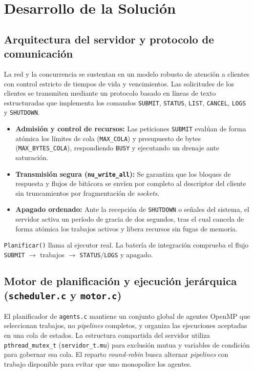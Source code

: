 \documentclass[12pt,a4paper]{article}
\newcommand{\code}[1]{\texttt{#1}}
\begin{document}
\section{Desarrollo de la Solución}

\subsection{Arquitectura del servidor y protocolo de comunicación}

La red y la concurrencia se sustentan en un modelo robusto de atención a clientes con control estricto de tiempos de vida y vencimientos. Las solicitudes de los clientes se transmiten mediante un protocolo basado en líneas de texto estructuradas que implementa los comandos \code{SUBMIT}, \code{STATUS}, \code{LIST}, \code{CANCEL}, \code{LOGS} y \code{SHUTDOWN}.

\begin{itemize}
  \item \textbf{Admisión y control de recursos:} Las peticiones \code{SUBMIT} evalúan de forma atómica los límites de cola (\code{MAX\_COLA}) y presupuesto de bytes (\code{MAX\_BYTES\_COLA}), respondiendo \code{BUSY} y ejecutando un drenaje ante saturación.
  \item \textbf{Transmisión segura (\code{nu\_write\_all}):} Se garantiza que los bloques de respuesta y flujos de bitácora se envíen por completo al descriptor del cliente sin truncamientos por fragmentación de \textit{sockets}.
  \item \textbf{Apagado ordenado:} Ante la recepción de \code{SHUTDOWN} o señales del sistema, el servidor activa un período de gracia de dos segundos, tras el cual cancela de forma atómica los trabajos activos y libera recursos sin fugas de memoria.
\end{itemize}

\code{Planificar()} llama al ejecutor real. La batería de integración comprueba el flujo \code{SUBMIT} $\rightarrow$ trabajos $\rightarrow$ \code{STATUS}/\code{LOGS} y apagado.

\subsection{Motor de planificación y ejecución jerárquica (\code{scheduler.c} y \code{motor.c})}

El planificador de \code{agents.c} mantiene un conjunto global de agentes OpenMP que seleccionan trabajos, no \textit{pipelines} completos, y organiza las ejecuciones aceptadas en una cola de estados. La estructura compartida del servidor utiliza \code{pthread\_mutex\_t} (\code{servidor\_t.mu}) para exclusión mutua y variables de condición para gobernar esa cola. El reparto \textit{round-robin} busca alternar \textit{pipelines} con trabajo disponible para evitar que uno monopolice los agentes.
\end{document}
